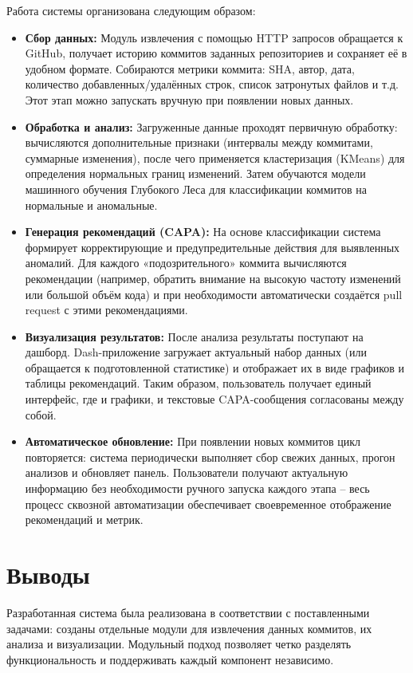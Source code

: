 Работа системы организована следующим образом:
\begin{itemize} 
	\item \textbf{Сбор данных:} Модуль извлечения с помощью HTTP запросов обращается к GitHub, получает историю коммитов заданных репозиториев и сохраняет её в удобном формате. Собираются метрики коммита: SHA, автор, дата, количество добавленных/удалённых строк, список затронутых файлов и т.д. Этот этап можно запускать вручную при появлении новых данных.
	 \item \textbf{Обработка и анализ:} Загруженные данные проходят первичную обработку: вычисляются дополнительные признаки (интервалы между коммитами, суммарные изменения), после чего применяется кластеризация (KMeans) для определения нормальных границ изменений. Затем обучаются модели машинного обучения Глубокого Леса для классификации коммитов на нормальные и аномальные.
	 \item \textbf{Генерация рекомендаций (CAPA):} На основе классификации система формирует корректирующие и предупредительные действия для выявленных аномалий. Для каждого «подозрительного» коммита вычисляются рекомендации (например, обратить внимание на высокую частоту изменений или большой объём кода) и при необходимости автоматически создаётся pull request с этими рекомендациями.
	 \item \textbf{Визуализация результатов:} После анализа результаты поступают на дашборд. Dash-приложение загружает актуальный набор данных (или обращается к подготовленной статистике) и отображает их в виде графиков и таблицы рекомендаций. Таким образом, пользователь получает единый интерфейс, где и графики, и текстовые CAPA-сообщения согласованы между собой.
	 \item \textbf{Автоматическое обновление:} При появлении новых коммитов цикл повторяется: система периодически выполняет сбор свежих данных, прогон анализов и обновляет панель. Пользователи получают актуальную информацию без необходимости ручного запуска каждого этапа – весь процесс сквозной автоматизации обеспечивает своевременное отображение рекомендаций и метрик.
\end{itemize}

\section{Выводы} \label{ch3:sec6}

Разработанная система была реализована в соответствии с поставленными задачами: созданы отдельные модули для извлечения данных коммитов, их анализа и визуализации. Модульный подход позволяет четко разделять функциональность и поддерживать каждый компонент независимо. 

